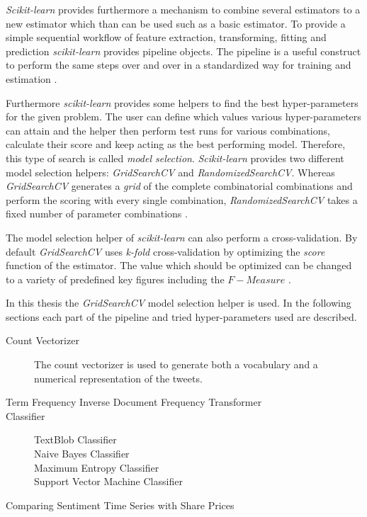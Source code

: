 \emph{Scikit-learn} provides furthermore a mechanism to combine several estimators to a new estimator which than can be used such as a basic estimator.
To provide a simple sequential workflow of feature extraction, transforming, fitting and prediction \emph{scikit-learn} provides pipeline objects.
The pipeline is a useful construct to perform the same steps over and over in a standardized way for training and estimation
\cite{buitinck2013api}.

Furthermore \emph{scikit-learn} provides some helpers to find the best hyper-parameters for the given problem.
The user can define which values various hyper-parameters can attain and the helper then perform test runs for various combinations, calculate their score and keep acting as the best performing model.
Therefore, this type of search is called \emph{model selection}.
\emph{Scikit-learn} provides two different model selection helpers: \emph{GridSearchCV} and \emph{RandomizedSearchCV}.
Whereas \emph{GridSearchCV} generates a \emph{grid} of the complete combinatorial combinations and perform the scoring with every single combination, \emph{RandomizedSearchCV} takes a fixed number of parameter combinations
\cite{buitinck2013api}.

The model selection helper of \emph{scikit-learn} can also perform a cross-validation.
By default \emph{GridSearchCV} uses \emph{k-fold} cross-validation by optimizing the \emph{score} function of the estimator.
The value which should be optimized can be changed to a variety of predefined key figures including the $F-Measure$
\cite{buitinck2013api}.

In this thesis the \emph{GridSearchCV} model selection helper is used. 
In the following sections each part of the pipeline and tried hyper-parameters used are described.

\begin{description}
  \item[Count Vectorizer] 
    The count vectorizer is used to generate both a vocabulary and a numerical representation of the tweets.


  \item[Term Frequency Inverse Document Frequency Transformer]
    
  \item[Classifier]
    
    \begin{description}
      \item[TextBlob Classifier]
        
      \item[Naive Bayes Classifier]
        
      \item[Maximum Entropy Classifier]
        
      \item[Support Vector Machine Classifier]
        
    \end{description}
  \item[Comparing Sentiment Time Series with Share Prices]
    

\end{description}

